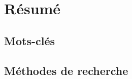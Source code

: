 \chapter*{Résumé}
\thispagestyle{empty} %


\section*{Mots-clés}


\section*{Méthodes de recherche}


